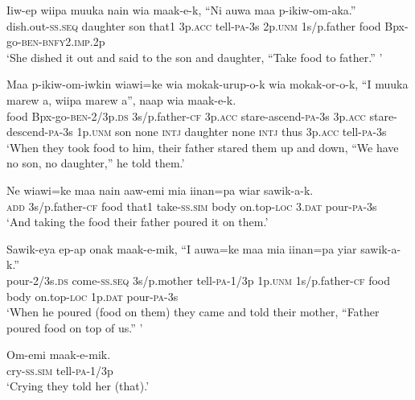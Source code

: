 \ea\label{ex:a:x8}
\gll  Iiw-ep  wiipa  muuka  nain  wia  maak-e-k,  “Ni              auwa  maa  p-ikiw-om-aka.” \\
dish.out-\textsc{ss.seq}  daughter  son  that1  3p.\textsc{acc}  tell-\textsc{pa}-3s  2p.\textsc{unm}  1s/p.father  food  Bpx-go-\textsc{ben}-\textsc{bnfy}2.\textsc{imp}.2p \\


\glt ‘She dished it out and said to the son and daughter, “Take food to father.” ’ \\
\z


\ea\label{ex:a:x9}
\gll  Maa  p-ikiw-om-iwkin  wiawi=ke  wia  mokak-urup-o-k              wia  mokak-or-o-k,  “I  muuka  marew  a,  wiipa                 marew  a”,  naap  wia  maak-e-k. \\
food  Bpx-go-\textsc{ben}-2/3p.\textsc{ds}  3s/p.father-\textsc{cf}  3p.\textsc{acc}  stare-ascend-\textsc{pa}-3s   3p.\textsc{acc}  stare-descend-\textsc{pa}-3s  1p.\textsc{unm}  son  none  \textsc{intj}  daughter  none  \textsc{intj}  thus  3p.\textsc{acc}  tell-\textsc{pa}-3s \\




\glt ‘When they took food to him, their father stared them up and down, “We have no son, no daughter,” he told them.’ \\
\z


\ea\label{ex:a:x10}
\gll  Ne  wiawi=ke  maa  nain  aaw-emi  mia  iinan=pa  wiar  sawik-a-k. \\
\textsc{add}  3s/p.father-\textsc{cf}  food  that1  take-\textsc{ss}.\textsc{sim}  body  on.top-\textsc{loc}  3.\textsc{dat}  pour-\textsc{pa}-3s \\
\glt ‘And taking the food their father poured it on them.’ \\
\z


\ea\label{ex:a:x11}
\gll  Sawik-eya  ep-ap  onak  maak-e-mik,  “I  auwa=ke                         maa  mia  iinan=pa  yiar  sawik-a-k.” \\
pour-2/3s.\textsc{ds}  come-\textsc{ss.seq}  3s/p.mother  tell-\textsc{pa}-1/3p  1p.\textsc{unm}  1s/p.father-\textsc{cf}   food  body  on.top-\textsc{loc}  1p.\textsc{dat}  pour-\textsc{pa}-3s \\


\glt ‘When he poured (food on them) they came and told their mother, “Father poured food on top of us.” ’ \\
\z


\ea\label{ex:a:x12}
\gll  Om-emi  maak-e-mik. \\
cry-\textsc{ss}.\textsc{sim}  tell-\textsc{pa}-1/3p \\
\glt ‘Crying they told her (that).’ \\
\z


